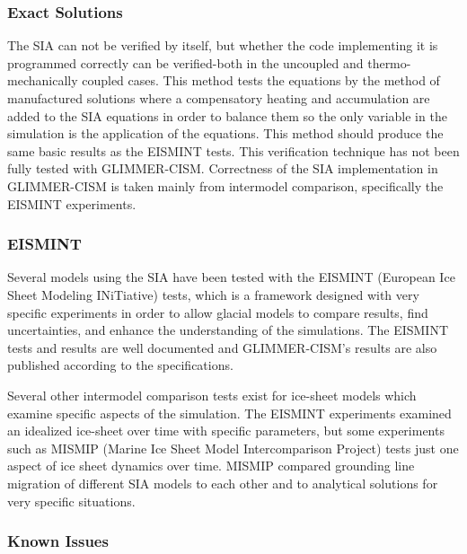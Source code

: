 
\subsubsection{Exact Solutions}

The SIA can not be verified by itself, but whether the code implementing it is programmed correctly can be verified-both in the uncoupled \citep{bueler:2005} and thermo-mechanically coupled cases.\citep{bueler:2007}  This method tests the equations by the method of manufactured solutions where a compensatory heating and accumulation are added to the SIA equations in order to balance them so the only variable in the simulation is the application of the equations.  This method should produce the same basic results as the EISMINT tests. This verification technique has not been fully tested with GLIMMER-CISM.  Correctness of the SIA implementation in GLIMMER-CISM is taken mainly from intermodel comparison, specifically the EISMINT experiments. 

\subsubsection{EISMINT}

Several models using the SIA have been tested with the EISMINT (European Ice Sheet Modeling INiTiative) tests, which is a framework designed with very specific experiments in order to allow glacial models to compare results, find uncertainties, and enhance the understanding of the simulations.  The EISMINT tests and results are well documented and GLIMMER-CISM's results are also published according to the specifications. \citep{Huybrechts:1996}\citep{glimmerdoc} 

Several other intermodel comparison tests exist for ice-sheet models which examine specific aspects of the simulation.  The EISMINT experiments examined an idealized ice-sheet over time with specific parameters, but some experiments such as MISMIP (Marine Ice Sheet Model Intercomparison Project) tests just one aspect of ice sheet dynamics over time.  MISMIP compared grounding line migration of different SIA models to each other and to analytical solutions for very specific situations. \cite{mismip4}



\subsubsection{Known Issues}

